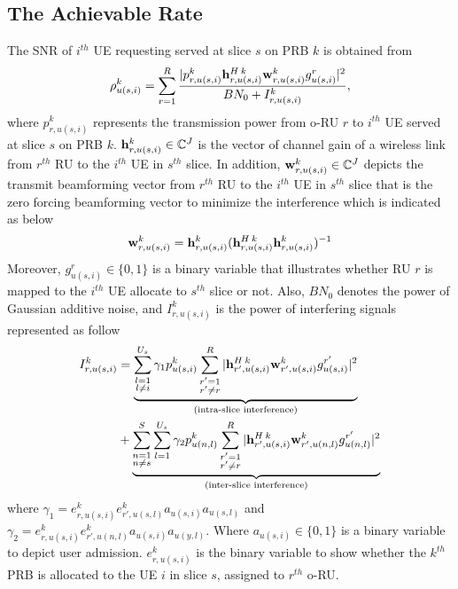 \documentclass[conference]{IEEEtran}
\begin{document}
\subsection{The Achievable Rate}
The SNR of $i^{th}$ UE requesting served at slice $s$ on PRB $k$ is obtained from
\begin{equation}\label{eq2}
\rho_{u(s,i)}^{k} =  \sum_{r=1}^{R}\frac{|p_{r,u(s,i)}^{k}{\bold{h}_{r,u(s,i)}^{H \: k}} \bold{w}_{r,u(s,i)}^{k} g_{u(s,i)}^r|^2}{BN_0 + I_{r,u(s,i)}^{k}},
\end{equation} 
where $p_{r,u(s,i)}^{k}$ represents the transmission power from o-RU $r$ to $i^{th}$ UE served at slice $s$ on PRB $k$. 
${\bold{h}_{r,u(s,i)}^{k}} \in \mathbb{C}^{J}$ is the vector of channel gain of a wireless link from 
$r^{th}$ RU to the $i^{th}$ UE in $s^{th}$ slice. In addition, $\bold{w}_{r,u(s,i)}^{k} \in \mathbb{C}^{J}$ depicts the  transmit beamforming vector from $r^{th}$ RU to the $i^{th}$ UE in $s^{th}$ slice that is the zero forcing beamforming vector to minimize the interference which is indicated as below
\begin{equation}
\bold{w}_{r,u(s,i)}^{k} = {\bold{h}_{r,u(s,i)}^{k}}({\bold{h}_{r,u(s,i)}^{H \: k}} {\bold{h}_{r,u(s,i)}^{k}})^{-1}
\end{equation}
Moreover, $g_{u(s,i)}^r \in \{0,1\}$ is a binary variable that illustrates whether RU $r$ is mapped to the $i^{th}$ UE allocate to $s^{th}$ slice or not. 
Also, $BN_0$ denotes the power of Gaussian additive noise, and $I_{r,u(s,i)}^{k}$ is the power of interfering signals represented as follow
\begin{equation}
\begin{split}
I_{r,u(s,i)}^{k} &=
 \underbrace{\sum_{\substack{l=1 \\ l\neq i}}^{{U}_{s}} \gamma_{1}  p_{u(s,i)}^{k}\sum_{\substack{r'=1 \\ r'\neq r}}^{R}|{\bold{h}_{r',u(s,i)}^{H \: k}} \bold{w}_{r',u(s,i)}^{k} g_{u(s,i)}^{r'}|^2}_{\text{(intra-slice interference)}}\\
&+ \underbrace{\sum_{\substack{n = 1 \\ n\neq s}}^{S}\sum_{l=1}^{{U}_s} \gamma_{2}  p_{u(n,l)}^{k}\sum_{\substack{r'=1 \\ r'\neq r}}^{R}|{\bold{h}_{r',u(s,i)}^{H \: k}} \bold{w}_{r',u(n,l)}^{k} g_{u(n,l)}^{r'}|^2}_{\text{(inter-slice interference)}}\\
\end{split}
\end{equation}
where $\gamma_{1} = e^{k}_{r,u(s,i)}e^{k}_{r',u(s,l)}a_{u(s,i)}a_{u(s,l)}$
and $\gamma_{2} = e^{k}_{r,u(s,i)}e^{k}_{r',u(n,l)}a_{u(s,i)}a_{u(y,l)}$.
Where $a_{u(s,i)} \in \{0,1\}$ is a binary variable to depict user admission.
$e^{k}_{r,u(s,i)}$ is the binary variable to show whether the $k^{th}$ PRB is allocated to the UE $i$ in slice $s$, assigned to $r^{th}$ o-RU.
\end{document}
